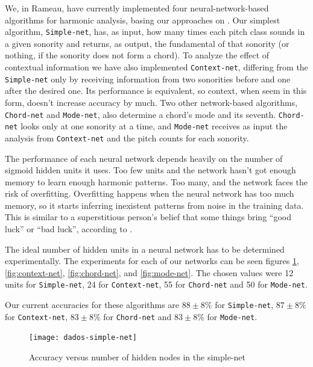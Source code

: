 \documentclass{article}
\begin{document}
We, in Rameau, have currently implemented four neural-network-based
algorithms for harmonic analysis, basing our approaches on
\cite{tsui02:_harmon_analy_using_neural_networ}. Our simplest
algorithm, \texttt{Sim\-ple\--net}, has, as input, how many times each
pitch class sounds in a given sonority and returns, as output, the
fundamental of that sonority (or nothing, if the sonority does not
form a chord). To analyze the effect of contextual information we have
also implemented \texttt{Con\-text\--net}, differing from the
\texttt{Sim\-ple\--net} only by receiving information from two sonorities
before and one after the desired one. Its performance is equivalent,
so context, when seem in this form, doesn't increase accuracy by
much. Two other network-based algorithms, \texttt{Chord\--net} and
\texttt{Mo\-de\--net}, also determine a chord's mode and its
seventh. \texttt{Chord\--net} looks only at one sonority at a time, and
\texttt{Mo\-de\--net} receives as input the analysis from
\texttt{Con\-text\--net} and the pitch counts for each sonority.

The performance of each neural network depends heavily on the number
of sigmoid hidden units it uses. Too few units and the network hasn't
got enough memory to learn enough harmonic patterns. Too many, and the
network faces the risk of overfitting. Overfitting happens when the
neural network has too much memory, so it starts inferring inexistent
patterns from noise in the training data. This is similar to a
superstitious person's belief that some things bring ``good luck'' or
``bad luck'', according to \cite{white95:superstitious}.

The ideal number of hidden units in a neural network has to be
determined experimentally. The experiments for each of our networks
can be seen figures \ref{fig:simple-net}, \ref{fig:context-net},
\ref{fig:chord-net}, and \ref{fig:mode-net}. The chosen values were 12
units for \texttt{Simple-net}, 24 for \texttt{Context-net}, 55 for
\texttt{Chord-net} and 50 for \texttt{Mode-net}.

Our current accuracies for these algorithms are $88\pm 8\%$ for
\texttt{Simple-net}, $87 \pm 8\%$ for \texttt{Context-net}, $83 \pm
8\%$ for \texttt{Chord-net} and $83 \pm 8\%$ for \texttt{Mode-net}.

\begin{figure}
  \texttt{[image: dados-simple-net]}
  \caption{Accuracy versus number of hidden nodes in the simple-net}
  \label{fig:simple-net}
\end{figure}
\end{document}
